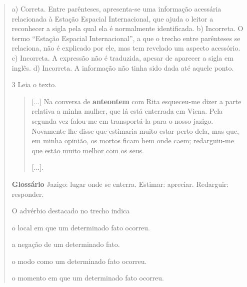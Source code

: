 \begin{quote}
{a) Correta. Entre parênteses, apresenta-se uma informação acessária relacionada à Estação Espacial Internacional, que ajuda o leitor a reconhecer a sigla pela qual ela é normalmente identificada.
b) Incorreta. O termo ``Estação Espacial Internacional'', a que o trecho entre parênteses se relaciona, não é explicado por ele, mas tem revelado um aspecto acessório.
c) Incorreta. A expressão não é traduzida, apesar de aparecer a sigla em inglês.
d) Incorreta. A informação não tinha sido dada até aquele ponto.}

\num{3} Leia o texto.

\begin{quote}
{[}...{]} Na conversa de \textbf{anteontem} com Rita esqueceu-me dizer
a parte relativa a minha mulher, que lá está enterrada em Viena. Pela
segunda vez falou-me em transportá-la para o nosso jazigo. Novamente lhe
disse que estimaria muito estar perto dela, mas que, em minha opinião,
os mortos ficam bem onde caem; redarguiu-me que estão muito melhor com
os seus.

{[}...{]}.

\end{quote}

\textbf{Glossário}
Jazigo: lugar onde se enterra.
Estimar: apreciar.
Redarguir: responder.

O advérbio destacado no trecho indica

\begin{escolha}
\item o local em que um determinado fato ocorreu.

\item a negação de um determinado fato.

\item o modo como um determinado fato ocorreu.

\item o momento em que um determinado fato ocorreu.
\end{escolha}



\end{quote}
